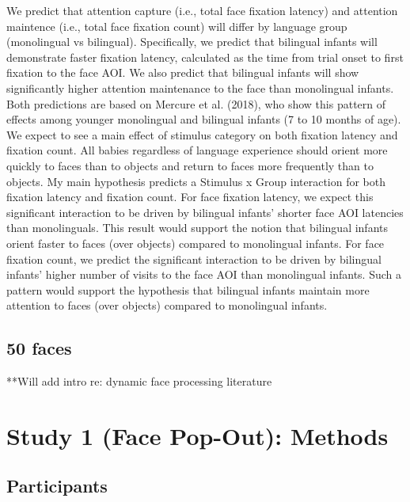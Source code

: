 \documentclass[english,man,floatsintext]{apa6}
\begin{document}
We predict that attention capture (i.e., total face fixation latency) and attention maintence (i.e., total face fixation count) will differ by language group (monolingual vs bilingual). Specifically, we predict that bilingual infants will demonstrate faster fixation latency, calculated as the time from trial onset to first fixation to the face AOI. We also predict that bilingual infants will show significantly higher attention maintenance to the face than monolingual infants. Both predictions are based on Mercure et al. (2018), who show this pattern of effects among younger monolingual and bilingual infants (7 to 10 months of age).
We expect to see a main effect of stimulus category on both fixation latency and fixation count. All babies regardless of language experience should orient more quickly to faces than to objects and return to faces more frequently than to objects. My main hypothesis predicts a Stimulus x Group interaction for both fixation latency and fixation count. For face fixation latency, we expect this significant interaction to be driven by bilingual infants' shorter face AOI latencies than monolinguals. This result would support the notion that bilingual infants orient faster to faces (over objects) compared to monolingual infants. For face fixation count, we predict the significant interaction to be driven by bilingual infants' higher number of visits to the face AOI than monolingual infants. Such a pattern would support the hypothesis that bilingual infants maintain more attention to faces (over objects) compared to monolingual infants.

\hypertarget{faces}{%
\subsection{50 faces}\label{faces}}

**Will add intro re: dynamic face processing literature

\hypertarget{study-1-face-pop-out-methods}{%
\section{Study 1 (Face Pop-Out): Methods}\label{study-1-face-pop-out-methods}}

\hypertarget{participants}{%
\subsection{Participants}\label{participants}}
\end{document}
